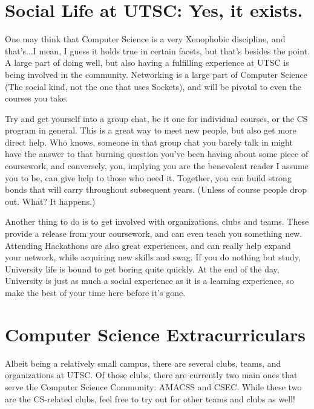 \documentclass[11pt]{article}
\begin{document}
\section{Social Life at UTSC: Yes, it exists.}
One may think that Computer Science is a very Xenophobic discipline, and that's...I mean, I guess it holds true in certain facets, but that's besides the point.  A large part of doing well, but also having a fulfilling experience at UTSC is being involved in the community.  Networking is a large part of Computer Science (The social kind, not the one that uses Sockets), and will be pivotal to even the courses you take.\par
Try and get yourself into a group chat, be it one for individual courses, or the CS program in general.  This is a great way to meet new people, but also get more direct help.  Who knows, someone in that group chat you barely talk in might have the answer to that burning question you've been having about some piece of coursework, and conversely, you, implying you are the benevolent reader I assume you to be, can give help to those who need it.  Together, you can build strong bonds that will carry throughout subsequent years. (Unless of course people drop out.  What? It happens.)\par
Another thing to do is to get involved with organizations, clubs and teams.  These provide a release from your coursework, and can even teach you something new.  Attending Hackathons are also great experiences, and can really help expand your network, while acquiring new skills and swag.  If you do nothing but study, University life is bound to get boring quite quickly.  At the end of the day, University is just as much a social experience as it is a learning experience, so make the best of your time here before it's gone.

\section{Computer Science Extracurriculars}
Albeit being a relatively small campus, there are several clubs, teams, and organizations at UTSC.  Of those clubs, there are currently two main ones that serve the Computer Science Community: AMACSS and CSEC.  While these two are the CS-related clubs, feel free to try out for other teams and clubs as well!
\end{document}
